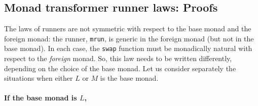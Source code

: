 \subsection{Monad transformer runner laws: Proofs}

The laws of runners are not symmetric with respect to the base monad
and the foreign monad: the runner, \lstinline!mrun!,
is generic in the foreign monad (but not in the base monad). In each
case, the \lstinline!swap!
function must be monadically natural with respect to the \emph{foreign}
monad. So, this law needs to be written differently, depending on
the choice of the base monad. Let us consider separately the situations
when either $L$ or $M$ is the base monad.

\paragraph{If the base monad is $L$, }

